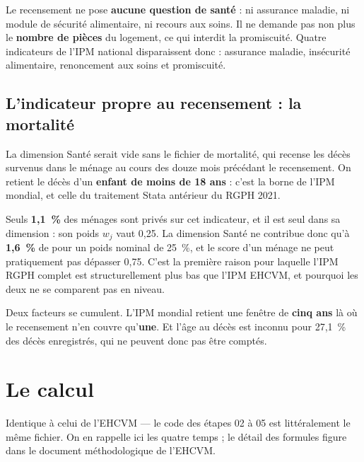 \documentclass[11pt,a4paper]{article}
\begin{document}
Le recensement ne pose \textbf{aucune question de santé} : ni assurance maladie, ni module de
sécurité alimentaire, ni recours aux soins. Il ne demande pas non plus le \textbf{nombre de pièces}
du logement, ce qui interdit la promiscuité. Quatre indicateurs de l'IPM national disparaissent
donc : assurance maladie, insécurité alimentaire, renoncement aux soins et promiscuité.

\subsection{L'indicateur propre au recensement : la mortalité}
\label{sec:mortalite}

La dimension Santé serait vide sans le fichier de mortalité, qui recense les décès survenus dans le
ménage au cours des douze mois précédant le recensement. On retient le décès d'un
\textbf{enfant de moins de 18 ans} : c'est la borne de l'IPM mondial, et celle du traitement Stata
antérieur du RGPH 2021.

\begin{attention}
Seuls \textbf{1,1~\%} des ménages sont privés sur cet indicateur, et il est seul dans sa dimension :
son poids $w_j$ vaut 0,25. La dimension Santé ne contribue donc qu'à \textbf{1,6~\%} de \ipm{}
pour un poids nominal de 25~\%, et le score d'un ménage ne peut pratiquement pas dépasser 0,75.
C'est la première raison pour laquelle l'IPM RGPH complet est structurellement plus bas que l'IPM
EHCVM, et pourquoi les deux ne se comparent pas en niveau.

Deux facteurs se cumulent. L'IPM mondial retient une fenêtre de \textbf{cinq ans} là où le
recensement n'en couvre qu'\textbf{une}. Et l'âge au décès est inconnu pour 27,1~\% des décès
enregistrés, qui ne peuvent donc pas être comptés.
\end{attention}

\section{Le calcul}

Identique à celui de l'EHCVM --- le code des étapes 02 à 05 est littéralement le même fichier. On
en rappelle ici les quatre temps ; le détail des formules figure dans le document méthodologique
de l'EHCVM.
\end{document}
